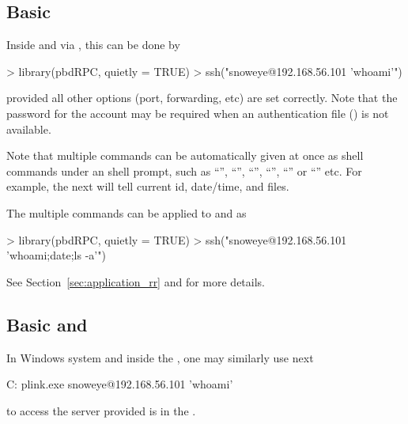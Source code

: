\subsection[Basic \code{ssh()}]{Basic }
\label{sec:basic_ssh}

Inside  and via , this can be done by
\begin{Code}[title=Basic \code{ssh()} in \pkg{pbdRPC} and \proglang{R}]
> library(pbdRPC, quietly = TRUE)
> ssh("snoweye@192.168.56.101 'whoami'")
\end{Code}
provided all other options (port, forwarding, etc) are set correctly.
Note that the password for the account may be required when an
authentication file () is not available.

Note that multiple commands can be automatically given at once
as shell commands under an shell prompt, such as ``\code{;}'', ``\code{\&\&}'',
``\code{>}'', ``\code{<}'', ``\code{|}'' or ``\code{\&}'' etc.
For example, the next will tell current id, date/time, and files.
The multiple commands can be applied to  and  as
\begin{Code}[title=Multipel commands to \code{ssh()} in \pkg{pbdRPC} and \proglang{R}]
> library(pbdRPC, quietly = TRUE)
> ssh("snoweye@192.168.56.101 'whoami;date;ls -a'")
\end{Code}
See Section~\ref{sec:application_rr} and  for
more details.


\subsection[Basic \code{plink.exe} and \code{plink()}]{Basic  and }
\label{sec:basic_plink}

In Windows system and inside the , one may similarly use next
\begin{Command}[title=Basic \code{plink.exe} in \code{cmd.exe}]
C:\> plink.exe snoweye@192.168.56.101 'whoami'
\end{Command}
to access the server provided  is in the .

